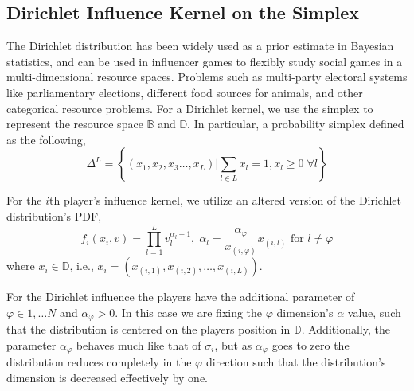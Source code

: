 \documentclass{article}
\newcommand {\D}{\mathbb{D}}
\begin{document}
    \subsection{Dirichlet Influence Kernel on the Simplex}
         The Dirichlet distribution has been widely used as a prior estimate in Bayesian statistics, and can be used in influencer games to flexibly study social games in a multi-dimensional resource spaces. Problems such as multi-party electoral systems like parliamentary elections, different food sources for animals, and other categorical resource problems. For a Dirichlet kernel, we use the simplex to represent the resource space $\mathbb{B}$ and $\mathbb{D}$. In particular, a probability simplex defined as the following, 
         \begin{equation}
             \Delta ^L=\left\{(x_1,x_2,x_3\dots,x_L )|\sum_{l\in L}x_l=1, x_l\geq 0 \;\forall l \right\}
         \end{equation}
         
        For the $i$th player's influence kernel, we utilize an altered version of the Dirichlet distribution's PDF,
        \begin{equation}
            f_{i}\left(x_{i},v\right) = \prod_{l=1}^{L}v_{l}^{\alpha_{l}-1},\; \alpha_{l}=\frac{\alpha_\varphi}{x_{\left(i,\varphi\right)}}x_{\left(i,l\right)} \text{ for } l\neq \varphi
        \end{equation}
        where $x_{i}\in \D$, i.e., $x_i=\left(x_{\left(i,1\right)},x_{\left(i,2\right)},\dots, x_{\left(i,L\right)}\right)$.
        
        
        For the Dirichlet influence the players have the additional parameter of $\varphi\in 1,\dots N$ and $\alpha_{\varphi}>0$. In this case we are fixing the $\varphi$ dimension's $\alpha$ value, such that the distribution is centered on the players position in $\mathbb{D}$. Additionally, the parameter $\alpha_{\varphi}$ behaves much like that of $\sigma_{i}$, but as $\alpha_{\varphi}$ goes to zero the distribution reduces completely in the $\varphi$ direction such that the distribution's dimension is decreased effectively by one.
    
        
    
\end{document}

